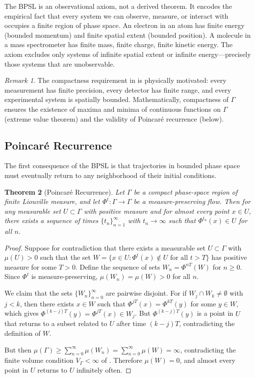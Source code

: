 \documentclass[11pt,twocolumn,a4paper]{article}
\newtheorem{theorem}{Theorem}[section]
\theoremstyle{definition}
\theoremstyle{remark}
\newtheorem{remark}[theorem]{Remark}
\begin{document}
The BPSL is an observational axiom, not a derived theorem. It encodes the empirical fact that every system we can observe, measure, or interact with occupies a finite region of phase space. An electron in an atom has finite energy (bounded momentum) and finite spatial extent (bounded position). A molecule in a mass spectrometer has finite mass, finite charge, finite kinetic energy. The axiom excludes only systems of infinite spatial extent or infinite energy---precisely those systems that are unobservable.

\begin{remark}\label{rem:bpsl-scope}
The compactness requirement in  is physically motivated: every measurement has finite precision, every detector has finite range, and every experimental system is spatially bounded. Mathematically, compactness of $\Gamma$ ensures the existence of maxima and minima of continuous functions on $\Gamma$ (extreme value theorem) and the validity of Poincar\'{e} recurrence (below).
\end{remark}

\subsection{Poincar\'{e} Recurrence}\label{sec:poincare}

The first consequence of the BPSL is that trajectories in bounded phase space must eventually return to any neighborhood of their initial conditions.

\begin{theorem}[Poincar\'{e} Recurrence]\label{thm:poincare}
Let $\Gamma$ be a compact phase-space region of finite Liouville measure, and let $\Phi^t\colon \Gamma \to \Gamma$ be a measure-preserving flow. Then for any measurable set $U \subset \Gamma$ with positive measure and for almost every point $x \in U$, there exists a sequence of times $\{t_n\}_{n=1}^{\infty}$ with $t_n \to \infty$ such that $\Phi^{t_n}(x) \in U$ for all $n$.
\end{theorem}

\begin{proof}
Suppose for contradiction that there exists a measurable set $U \subset \Gamma$ with $\mu(U) > 0$ such that the set $W = \{x \in U : \Phi^t(x) \notin U \text{ for all } t > T\}$ has positive measure for some $T > 0$. Define the sequence of sets $W_n = \Phi^{nT}(W)$ for $n \geq 0$. Since $\Phi^t$ is measure-preserving, $\mu(W_n) = \mu(W) > 0$ for all $n$.

We claim that the sets $\{W_n\}_{n=0}^{\infty}$ are pairwise disjoint. For if $W_j \cap W_k \neq \emptyset$ with $j < k$, then there exists $x \in W$ such that $\Phi^{jT}(x) = \Phi^{kT}(y)$ for some $y \in W$, which gives $\Phi^{(k-j)T}(y) = \Phi^{jT}(x) \in W_j$. But $\Phi^{(k-j)T}(y)$ is a point in $U$ that returns to a subset related to $U$ after time $(k-j)T$, contradicting the definition of $W$.

But then $\mu(\Gamma) \geq \sum_{n=0}^{\infty} \mu(W_n) = \sum_{n=0}^{\infty} \mu(W) = \infty$, contradicting the finite volume condition $V_\Gamma < \infty$ of . Therefore $\mu(W) = 0$, and almost every point in $U$ returns to $U$ infinitely often.
\end{proof}
\end{document}
